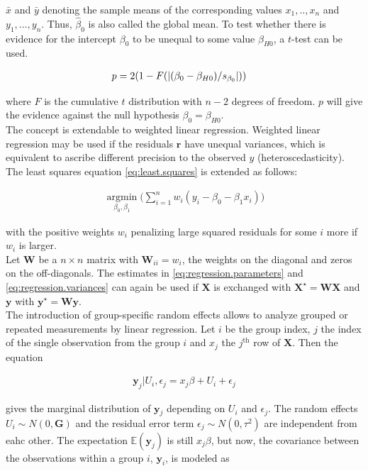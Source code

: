 \documentclass[11pt,a4paper,twoside]{book}\usepackage[]{graphicx}\usepackage[]{color}
\begin{document}
$\bar{x}$ and $\bar{y}$ denoting the sample means of the corresponding values $x_1, .., x_n$ and $y_1, ..., y_n$. Thus, $\hat{\beta}_0$ is also called the global mean.
To test whether there is evidence for the intercept $\beta_0$ to be unequal to some value $\beta_{H0}$, a $t$-test can be used. 

\begin{align}
p &= 2(1-F(\left\lvert(\beta_0 - \beta_{H0})/s_{\beta_0}\right\rvert)) \nonumber
\end{align}

where $F$ is the cumulative $t$ distribution with $n-2$ degrees of freedom. $p$ will give the evidence against the null hypothesis $\beta_0 = \beta_{H0}$. \\
The concept is extendable to weighted linear regression. Weighted linear regression may be used if the residuals $\mathbf{r}$ have unequal variances, which is equivalent to ascribe different precision to the observed $y$ (heteroscedasticity). The least squares equation \eqref{eq:least.squares} is extended as follows:

\begin{align}
\operatorname*{argmin}_{\beta_0, \beta_1}\Big(\sum_{i = 1}^n w_i(y_i - \beta_0 - \beta_1 x_i)\Big) \nonumber
\end{align}

with the positive weights $w_i$ penalizing large squared residuals for some $i$ more if $w_i$ is larger. \\
Let $\mathbf{W}$ be a $n \times n$ matrix with $\mathbf{W}_{ii} = w_i$, the weights on the diagonal and zeros on the off-diagonals. The estimates in \eqref{eq:regression.parameters} and \eqref{eq:regression.variances} can again be used if $\mathbf{X}$ is exchanged with $\mathbf{X}^\star =  \mathbf{W} \mathbf{X}$ and $\mathbf{y}$ with $\mathbf{y}^\star = \mathbf{W} \mathbf{y}$. \label{weighted.regression} \\
The introduction of group-specific random effects allows to analyze grouped or repeated measurements by linear regression. Let $i$ be the group index, $j$ the index of the single observation from the group $i$ and $x_j$ the $j^\textrm{th}$ row of $\mathbf{X}$. Then the equation

\begin{align}
\mathbf{y}_{j}|U_i,\epsilon_{j} =  x_j\beta + U_i + \epsilon_{j} \label{eq:one.random.intercept}
\end{align}

gives the marginal distribution of $\mathbf{y}{_{j}}$ depending on $U{_i}$ and $\epsilon{_{j}}$. The random effects $U{_i} \sim N(0, \mathbf{G})$ and the residual error term $\epsilon{_{j}} \sim N(0, \tau^{2})$ are independent from eahc other. The expectation $\mathbb{E}(\mathbf{y}_{j})$ is still $x_j \beta$, but now, the covariance between the observations within a group $i$, $\mathbf{y}_i$, is modeled as
\end{document}
